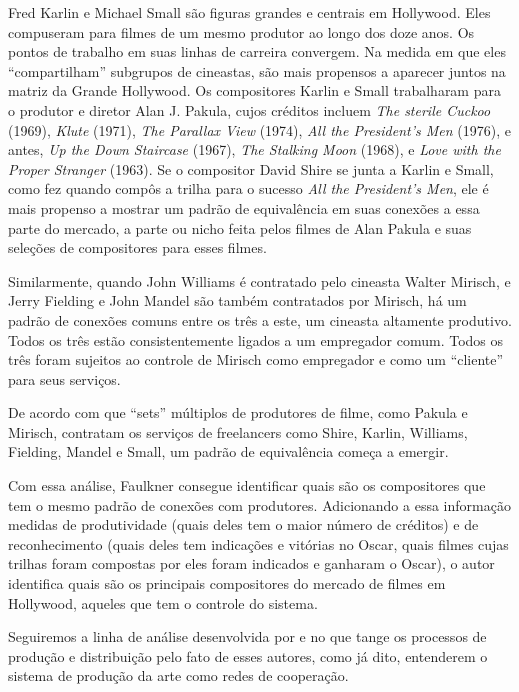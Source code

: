 \documentclass[a4paper, 12pt, openright, oneside, german, french, english, brazil]{abntex2}
\begin{document}
	\begin{citacao}
		Fred Karlin e Michael Small são figuras grandes e centrais em Hollywood. Eles compuseram para filmes de um mesmo produtor ao longo dos doze anos. Os pontos de trabalho em suas linhas de carreira convergem. Na medida em que eles ``compartilham'' subgrupos de cineastas, são mais propensos a aparecer juntos na matriz da Grande Hollywood. Os compositores Karlin e Small trabalharam para o produtor e diretor Alan J. Pakula, cujos créditos incluem \textit{The sterile Cuckoo} (1969), \textit{Klute} (1971), \textit{The Parallax View} (1974), \textit{All the President's Men }(1976), e antes, \textit{Up the Down Staircase }(1967), \textit{The Stalking Moon }(1968), e \textit{Love with the Proper Stranger }(1963). Se o compositor David Shire se junta a Karlin e Small, como fez quando compôs a trilha para o sucesso \textit{All the President's Men}, ele é mais propenso a mostrar um padrão de equivalência em suas conexões a essa parte do mercado, a parte ou nicho feita pelos filmes de Alan Pakula e suas seleções de compositores para esses filmes.
		
		Similarmente, quando John Williams é contratado pelo cineasta Walter Mirisch, e Jerry Fielding e John Mandel são também contratados por Mirisch, há um padrão de conexões comuns entre os três a este, um cineasta altamente produtivo. Todos os três estão consistentemente ligados a um empregador comum. Todos os três foram sujeitos ao controle de Mirisch como empregador e como um ``cliente'' para seus serviços.
		
		De acordo com que ``sets'' múltiplos de produtores de filme, como Pakula e Mirisch, contratam os serviços de freelancers como Shire, Karlin, Williams, Fielding, Mandel e Small, um padrão de equivalência começa a emergir. \cite[p. 186]{faulkner2003music}
	\end{citacao}
	
	Com essa análise, Faulkner consegue identificar quais são os compositores que tem o mesmo padrão de conexões com produtores. Adicionando a essa informação medidas de produtividade (quais deles tem o maior número de créditos) e de reconhecimento (quais deles tem indicações e vitórias no Oscar, quais filmes cujas trilhas foram compostas por eles foram indicados e ganharam o Oscar), o autor identifica quais são os principais compositores do mercado de filmes em Hollywood, aqueles que tem o controle do sistema.
	
	Seguiremos a linha de análise desenvolvida por  e  no que tange os processos de produção e distribuição pelo fato de esses autores, como já dito, entenderem o sistema de produção da arte como redes de cooperação.
	
\end{document}
